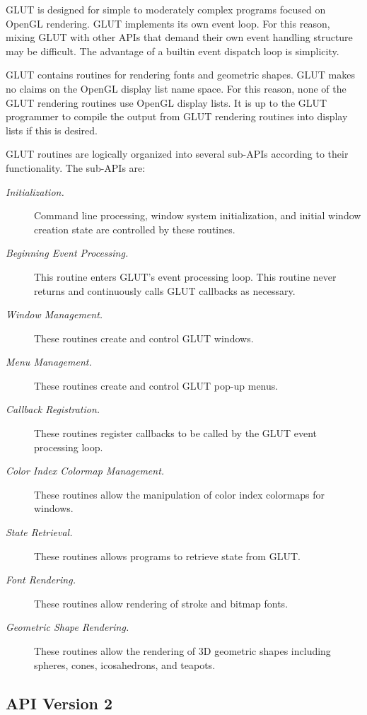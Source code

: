 GLUT is designed for simple to moderately complex programs focused on OpenGL
rendering.  GLUT implements its own event loop.  For this reason, mixing GLUT
with other APIs that demand their own event handling structure may be difficult.
The advantage of a builtin event dispatch loop is simplicity.

GLUT contains routines for rendering fonts and geometric shapes.  GLUT makes
no claims on the OpenGL display list name space.  For this reason, none of the
GLUT rendering routines use OpenGL display lists.  It is up to the GLUT programmer
to compile the output from GLUT rendering routines into display lists
if this is desired.

GLUT routines are logically organized into several sub-APIs according
to their functionality.  The sub-APIs are:
\begin{description}
\item[\em Initialization.]
Command line processing,
window system initialization, and initial window creation state are controlled
by these routines.
\item[\em Beginning Event Processing.]
This routine enters GLUT's event processing loop.  This routine never returns
and continuously calls GLUT callbacks as necessary.
\item[\em Window Management.]
These routines create and control GLUT windows.
\item[\em Menu Management.]
These routines create and control GLUT pop-up menus.
\item[\em Callback Registration.]
These routines register callbacks to be called by the GLUT event processing loop.
\item[\em Color Index Colormap Management.]
These routines allow the manipulation of color index colormaps for windows.
\item[\em State Retrieval.]
These routines allows programs to retrieve state from GLUT.
\item[\em Font Rendering.]
These routines allow rendering of stroke and bitmap fonts.
\item[\em Geometric Shape Rendering.]
These routines allow the rendering of 3D geometric shapes including spheres,
cones, icosahedrons, and teapots.
\end{description}

\subsection{API Version 2}

